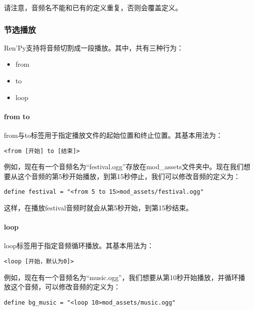 \documentclass[../../Main.tex]{subfiles}
\begin{document}
请注意，音频名不能和已有的定义重复，否则会覆盖定义。

\subsubsection{节选播放}
Ren'Py支持将音频切割成一段播放。其中，共有三种行为：
\begin{itemize}
    \item from
    \item to
    \item loop
\end{itemize}

\paragraph{from to} from与to标签用于指定播放文件的起始位置和终止位置。其基本用法为：
\begin{lstlisting}
<from [开始] to [结束]>
\end{lstlisting}
例如，现在有一个音频名为“festival.ogg”存放在mod\_assets文件夹中。现在我们想要从这个音频的第5秒开始播放，到第15秒停止，我们可以修改音频的定义为：

\begin{lstlisting}
define festival = "<from 5 to 15>mod_assets/festival.ogg"
\end{lstlisting}

这样，在播放festival音频时就会从第5秒开始，到第15秒结束。

\paragraph{loop} loop标签用于指定音频循环播放。其基本用法为：

\begin{lstlisting}
<loop [开始，默认为0]>
\end{lstlisting}

例如，现在有一个音频名为“music.ogg”，我们想要从第10秒开始播放，并循环播放这个音频，可以修改音频的定义为：

\begin{lstlisting}
define bg_music = "<loop 10>mod_assets/music.ogg"
\end{lstlisting}
\end{document}
